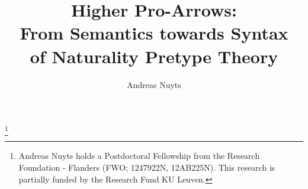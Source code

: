 \documentclass{lmcs} %
\theoremstyle{plain}\newtheorem{satz}[thm]{Satz} %
\theoremstyle{plain}
\theoremstyle{definition}
\begin{document}
\title[Higher Pro-Arrows: From Semantics towards Syntax of Naturality Pretype Theory]{Higher Pro-Arrows: \\ From Semantics towards Syntax \\ of Naturality Pretype Theory}

\author[Andreas Nuyts]{Andreas Nuyts}	%
\thanks{Andreas Nuyts holds a Postdoctoral Fellowship from the Research Foundation - Flanders (FWO; 1247922N, 12AB225N). This research is partially funded by the Research Fund KU Leuven.}	%

\address{DistriNet, KU Leuven, Belgium}	%





\end{document}
